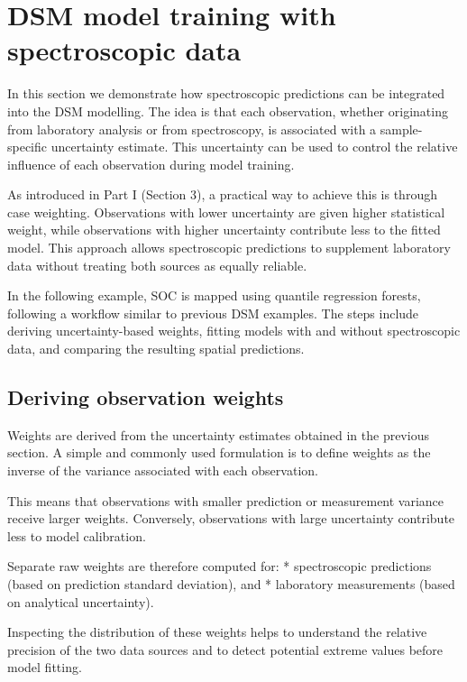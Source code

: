 \documentclass[
  10pt,
  b5paper,
  oneside]{book}
\begin{document}
\section{DSM model training with spectroscopic data}\label{dsm-model-training-with-spectroscopic-data}

In this section we demonstrate how spectroscopic predictions can be integrated into the DSM modelling. The idea is that each observation, whether originating from laboratory analysis or from spectroscopy, is associated with a sample-specific uncertainty estimate.
This uncertainty can be used to control the relative influence of each observation during model training.

As introduced in Part I (Section 3), a practical way to achieve this is through case weighting. Observations with lower uncertainty are given higher statistical weight, while observations with higher uncertainty contribute less to the fitted model. This approach allows spectroscopic predictions to supplement laboratory data without treating both sources as equally reliable.

In the following example, SOC is mapped using quantile regression forests, following a workflow similar to previous DSM examples. The steps include deriving uncertainty-based weights, fitting models with and without spectroscopic data, and comparing the resulting spatial predictions.

\subsection{Deriving observation weights}\label{deriving-observation-weights}

Weights are derived from the uncertainty estimates obtained in the previous section. A simple and commonly used formulation is to define weights as the inverse of the variance associated with each observation.

This means that observations with smaller prediction or measurement variance receive larger weights. Conversely, observations with large uncertainty contribute less to model calibration.

Separate raw weights are therefore computed for:
* spectroscopic predictions (based on prediction standard deviation), and
* laboratory measurements (based on analytical uncertainty).

Inspecting the distribution of these weights helps to understand the relative precision of the two data sources and to detect potential extreme values before model fitting.
\end{document}
